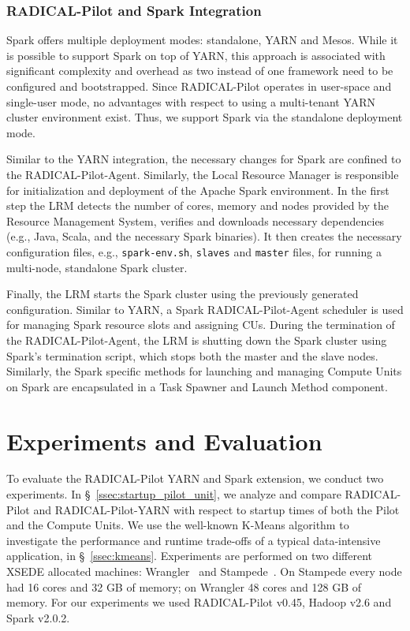 \subsubsection*{RADICAL-Pilot and Spark Integration}
\label{sssec:rp_spark}
Spark offers multiple deployment modes: standalone, YARN and Mesos.
While it is possible to support Spark on top of YARN, this approach is associated with significant complexity and overhead as two instead of one framework need to be configured and bootstrapped.
Since RADICAL-Pilot operates in user-space and single-user mode, no advantages with respect to using a multi-tenant YARN cluster environment exist.
Thus, we support Spark via the standalone deployment mode.

Similar to the YARN integration, the necessary changes for Spark are confined to the RADICAL-Pilot-Agent.
Similarly, the Local Resource Manager is responsible for initialization and deployment of the Apache Spark environment.
In the first step the LRM detects the number of cores, memory and nodes provided by the Resource Management System, verifies and downloads necessary dependencies (e.g., Java, Scala, and the necessary Spark binaries).
It then creates the necessary configuration files, e.g., \texttt{spark-env.sh}, \texttt{slaves} and \texttt{master} files, for running a multi-node, standalone Spark cluster.

Finally, the LRM starts the Spark cluster using the previously generated configuration.
Similar to YARN, a Spark RADICAL-Pilot-Agent scheduler is used for managing Spark resource slots and assigning CUs.
During the termination of the RADICAL-Pilot-Agent, the LRM is shutting down the Spark cluster using Spark’s termination script, which stops both the master and the slave nodes.
Similarly, the Spark specific methods for launching and managing Compute Units on Spark are encapsulated in a Task Spawner and Launch Method component.

\section{Experiments and Evaluation}
\label{sec:rph-exps}

To evaluate the RADICAL-Pilot YARN and Spark extension, we conduct two experiments.
In \S~\ref{ssec:startup_pilot_unit}, we analyze and compare RADICAL-Pilot and RADICAL-Pilot-YARN with respect to startup times of both the Pilot and the Compute Units.
We use the well-known K-Means algorithm to investigate the performance and runtime trade-offs of a typical data-intensive application, in \S~\ref{ssec:kmeans}.
Experiments are performed on two different XSEDE allocated machines: Wrangler~\cite{wrangler} and Stampede~\cite{stampede}.
On Stampede every node had 16 cores and 32 GB of memory; on Wrangler 48 cores and 128 GB of memory.
For our experiments we used RADICAL-Pilot v0.45, Hadoop v2.6 and Spark v2.0.2.

